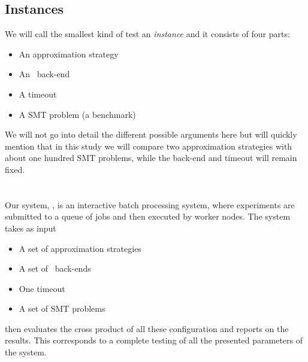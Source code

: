 \documentclass{article}
\begin{document}
\begin{multicols}{2}
\begin{Figure}
\label{fig:uppsat}
  \label{fig:uppsat}
\end{Figure}

\subsection{Instances}
We will call the smallest kind of test an \emph{instance} and it consists of four parts:
\begin{itemize}
\item An approximation strategy
\item An \uppsat\ back-end
\item A timeout
\item A SMT problem (a benchmark)
\end{itemize}

We will not go into detail the different possible arguments here but
will quickly mention that in this study we will compare two
approximation strategies with about one hundred SMT problems, while
the back-end and timeout will remain fixed.

\section{\testbench}

Our system, \testbench, is an interactive batch processing system,
where experiments are submitted to a queue of jobs and then executed
by worker nodes. The system takes as input
\begin{itemize}
  \item A set of approximation strategies
  \item A set of \uppsat\ back-ends
  \item One timeout
  \item A set of SMT problems
\end{itemize}
\testbench then evaluates the cross product of all these configuration
and reports on the results. This corresponds to a complete testing of
all the presented parameters of the system.


\end{multicols}
\end{document}
